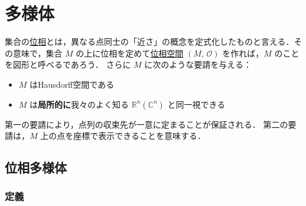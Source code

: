 \documentclass[geometry_main]{subfiles}
\begin{document}
\setcounter{chapter}{1}

\chapter{多様体}

集合の\hyperref[ax.topo]{位相}とは，異なる点同士の「近さ」の概念を定式化したものと言える．その意味で，集合 $M$ の上に位相を定めて\hyperref[ax.topo]{位相空間} $(M,\, \mathscr{O})$ を作れば，$M$ のことを図形と呼べるであろう．
さらに $M$ に次のような要請を与える：
\begin{itemize}
	\item $M$ はHausdorff空間である
	\item $M$ は\textbf{局所的に}我々のよく知る $\mathbb{R}^n (\mathbb{C}^n)$ と同一視できる
\end{itemize}
第一の要請により，点列の収束先が一意に定まることが保証される．
第二の要請は，$M$ 上の点を座標で表示できることを意味する．

\section{位相多様体}

\subsection{定義}
\end{document}
